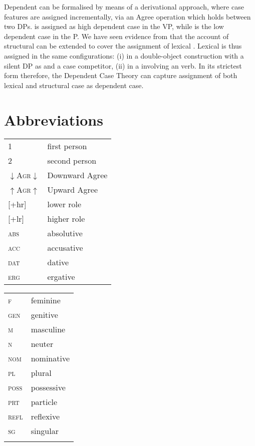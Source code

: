 \documentclass[output=paper,modfonts,newtxmath,hidelinks]{langscibook}
\begin{document}
Dependent  can be formalised by means of a derivational approach, where case features are assigned incrementally, via an Agree operation which holds between two DPs. \datt{} is assigned as high dependent case in the VP, while \accc{} is the low dependent case in the \littlev{}P. We have seen evidence from  that the account of structural \datt{} can be extended to cover the assignment of lexical \datt. Lexical  is thus assigned in the same configurations: (i) in a  double-object construction with a silent DP as  and a case competitor, (ii) in a  involving an  verb. In its strictest form therefore, the Dependent Case Theory can capture assignment of both lexical and structural  case as dependent case.

\section*{Abbreviations}

\begin{tabularx}{.5\textwidth}[t]{@{}lQ@{}}
1& first person\\
2& second person\\
{$\downarrow$\textsc{Agr}$\downarrow$}&Downward Agree\\
{$\uparrow$\textsc{Agr}$\uparrow$}&Upward Agree\\
{[+hr]}&lower role\\
{[+lr]}&higher role\\
\textsc{abs}&absolutive\\
\textsc{acc}&{accusative}\\
\textsc{dat}&{dative}\\
\textsc{erg}&{ergative}\\
\end{tabularx}%
\begin{tabularx}{.5\textwidth}[t]{@{}lQ@{}}
\textsc{f}&{feminine}\\
\textsc{gen}&{genitive}\\
\textsc{m}&{masculine}\\
\textsc{n}&{neuter}\\
\textsc{nom}&{nominative}\\
\textsc{pl}&{plural}\\
\textsc{poss}&possessive\\
\textsc{prt}&particle\\
\textsc{refl}&reflexive\\
\textsc{sg}&singular\\
&\\
\end{tabularx} 
\end{document}
